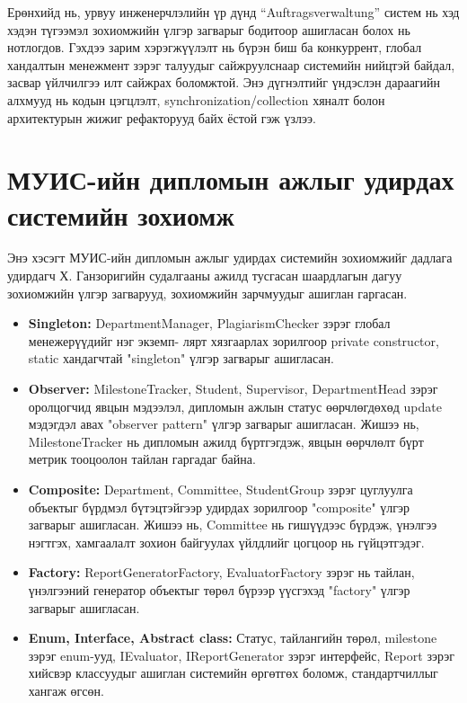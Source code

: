 Ерөнхийд нь, урвуу инженерчлэлийн үр дүнд “Auftragsverwaltung” систем нь хэд хэдэн түгээмэл зохиомжийн үлгэр загварыг бодитоор ашигласан болох нь нотлогдов. Гэхдээ зарим хэрэгжүүлэлт нь бүрэн биш ба конкуррент, глобал хандалтын менежмент зэрэг талуудыг сайжруулснаар системийн нийцтэй байдал, засвар үйлчилгээ илт сайжрах боломжтой. Энэ дүгнэлтийг үндэслэн дараагийн алхмууд нь кодын цэгцлэлт, synchronization/collection хяналт болон архитектурын жижиг рефакторууд байх ёстой гэж үзлээ.

\section{МУИС-ийн дипломын ажлыг удирдах системийн зохиомж}
Энэ хэсэгт МУИС-ийн дипломын ажлыг удирдах системийн зохиомжийг дадлага удирдагч Х. Ганзоригийн судалгааны ажилд тусгасан шаардлагын дагуу  зохиомжийн үлгэр загварууд, зохиомжийн зарчмуудыг ашиглан гаргасан.
\begin{itemize}
	\item \textbf{Singleton:} DepartmentManager, PlagiarismChecker зэрэг глобал менежерүүдийг нэг экземп- лярт хязгаарлах зорилгоор private constructor, static хандагчтай "singleton" үлгэр загварыг ашигласан.
	\item \textbf{Observer:} MilestoneTracker, Student, Supervisor, DepartmentHead зэрэг оролцогчид явцын мэдээлэл, дипломын ажлын статус өөрчлөгдөхөд update мэдэгдэл авах "observer pattern" үлгэр загварыг ашигласан. Жишээ нь, MilestoneTracker нь дипломын ажилд бүртгэгдэж, явцын өөрчлөлт бүрт метрик тооцоолон тайлан гаргадаг байна.
	\item \textbf{Composite:} Department, Committee, StudentGroup зэрэг цуглуулга объектыг бүрдмэл бүтэцтэйгээр удирдах зорилгоор "composite" үлгэр загварыг ашигласан. Жишээ нь, Committee нь гишүүдээс бүрдэж, үнэлгээ нэгтгэх, хамгаалалт зохион байгуулах үйлдлийг цогцоор нь гүйцэтгэдэг.
	\item \textbf{Factory:} ReportGeneratorFactory, EvaluatorFactory зэрэг нь тайлан, үнэлгээний генератор объектыг төрөл бүрээр үүсгэхэд "factory" үлгэр загварыг ашигласан.
	\item \textbf{Enum, Interface, Abstract class:} Статус, тайлангийн төрөл, milestone зэрэг enum-ууд, IEvaluator, IReportGenerator зэрэг интерфейс, Report зэрэг хийсвэр классуудыг ашиглан системийн өргөтгөх боломж, стандартчиллыг хангаж өгсөн.
\end{itemize}


